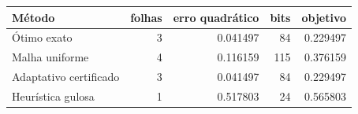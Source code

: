 \begin{tabular}{lrrrr}
\toprule
Método & folhas & erro quadrático & bits & objetivo \\
\midrule
Ótimo exato & 3 & 0.041497 & 84 & 0.229497 \\
Malha uniforme & 4 & 0.116159 & 115 & 0.376159 \\
Adaptativo certificado & 3 & 0.041497 & 84 & 0.229497 \\
Heurística gulosa & 1 & 0.517803 & 24 & 0.565803 \\
\bottomrule
\end{tabular}
